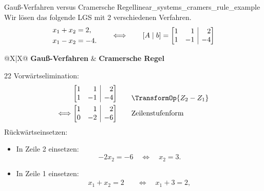 \begin{ExampleBox}{Gauß-Verfahren versus Cramersche Regel}{linear_systems_cramers_rule_example}
  Wir lösen das folgende LGS mit 2 verschiedenen Verfahren.
  \[
    \begin{aligned}
      x_1+x_2&=2,\\
      x_1-x_2&=-4.
    \end{aligned}
    \qquad\Longleftrightarrow\qquad
    [A\mid b]=
    \left[
      \begin{array}{@{}rr|r@{}}
        1& 1& 2\\
        1&-1&-4
      \end{array}
    \right]
  \]
  {\setlength{\tabcolsep}{0.1cm}%
  \setlength{\arrayrulewidth}{0.7pt}%
  \noindent\begin{tabularx}{\linewidth}{@{}X|X@{}}
  \centering\textbf{Gauß-Verfahren}
  &
  \centering\arraybackslash\textbf{Cramersche Regel}\\[0.2em]
  \hline
  \begin{minipage}[t]{\linewidth}
    \vspace{0.45em}
    \begin{ClozeArea}[16]{22}
      Vorwärtselimination:
      \[
        \begin{array}{r@{\;}c@{\qquad}l}
          &\left[\begin{array}{@{}rr|r@{}}
            1& 1& 2\\
            1&-1&-4
          \end{array}\right]
          &\raisebox{-0.65em}{\(\TransformOp{Z_2-Z_1}\)}\\[1.0em]
          \Longleftrightarrow
          &\left[\begin{array}{@{}rr|r@{}}
            1& 1& 2\\
            0&-2&-6
          \end{array}\right]
          &\text{Zeilenstufenform}
        \end{array}
      \]
      \smallskip
      Rückwärtseinsetzen:
      \begin{itemize}[leftmargin=1.4em,itemsep=0.3em,topsep=0.2em]
        \item In Zeile 2 einsetzen:
          \[
            -2x_2=-6
            \quad\Longleftrightarrow\quad x_2=3.
          \]
        \item In Zeile 1 einsetzen:
          \[
            \begin{aligned}
              x_1+x_2=2
              &\quad\Longleftrightarrow\quad x_1+3=2,\\

\end{aligned}\]
\end{itemize}
\end{ClozeArea}
\end{minipage}
\end{tabularx}}
\end{ExampleBox}
